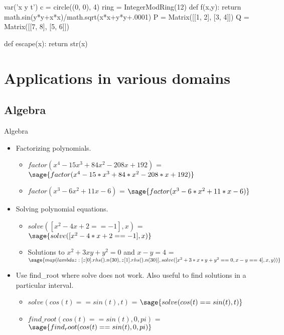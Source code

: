 \documentclass{beamer}
\begin{document}
\begin{sagesilent}
 var('x y t')
 c = circle((0, 0), 4)
 ring = IntegerModRing(12)
 def f(x,y):
  return math.sin(y*y+x*x)/math.sqrt(x*x+y*y+.0001)
 P = Matrix([[1, 2], [3, 4]])
 Q = Matrix([[7, 8], [5, 6]])
 
 def escape(x):
  return str(x)

\end{sagesilent}

\section{Applications in various domains}
\subsection{Algebra}
\begin{frame}{Algebra}
  \begin{itemize}
    \item Factorizing polynomials.
    \begin{itemize}
      \item $factor(x^{4} - 15 x^{3} + 84 x^{2} - 208 x + 192)$ = $\sage{factor(x^4 - 15*x^3 + 84*x^2 - 208*x + 192)}$
      \item $factor(x^{3} - 6 x^{2} +11 x -6)$ = $\sage{factor(x^3 - 6*x^2 +11*x -6)}$
    \end{itemize}
    \item Solving polynomial equations.
    \begin{itemize}
     \item $solve([x^{2} - 4 x + 2 == -1], x)$ = $\sage{solve([x^2 - 4*x + 2 == -1], x)}$
     \item Solutions to $x^{2}+ 3 x y + y^{2} = 0$ and $x - y = 4$ = $\sage{map(lambda z: [z[0].rhs().n(30), z[1].rhs().n(30)], solve([x^2+3*x*y+y^2 == 0, x - y == 4], x, y))}$
    \end{itemize}
    \item Use find\_root where solve does not work. Also useful to find solutions in a particular interval.
    \begin{itemize}
     \item $solve(cos(t) == sin(t), t)$ = $\sage{solve(cos(t) == sin(t), t)}$
     \item $find \_ root(cos(t) == sin(t), 0, pi)$ = $\sage{find_root(cos(t) == sin(t), 0, pi)}$
    \end{itemize}
  \end{itemize}
\end{frame}
\end{document}
